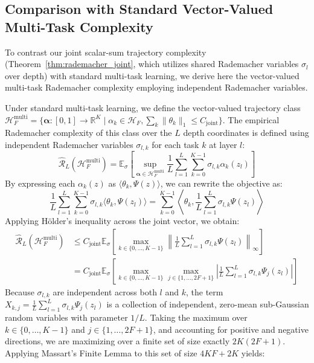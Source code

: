 \subsection{Comparison with Standard Vector-Valued Multi-Task Complexity}
\label{proof:thm_rademacher_joint_independent}
To contrast our joint scalar-sum trajectory complexity (Theorem~\ref{thm:rademacher_joint}, which utilizes shared Rademacher variables $\sigma_l$ over depth) with standard multi-task learning, we derive here the vector-valued multi-task Rademacher complexity employing independent Rademacher variables.

Under standard multi-task learning, we define the vector-valued trajectory class $\boldsymbol{\mathcal{H}}_F^{\text{multi}} = \{\boldsymbol{\alpha}: [0, 1] \to \mathbb{R}^K \mid \alpha_k \in \mathcal{H}_F, \sum_k \|\theta_k\|_1 \le C_{\text{joint}}\}$. The empirical Rademacher complexity of this class over the $L$ depth coordinates is defined using independent Rademacher variables $\sigma_{l,k}$ for each task $k$ at layer $l$:
\begin{equation}
    \widehat{\mathcal{R}}_L(\boldsymbol{\mathcal{H}}_F^{\text{multi}}) = \mathbb{E}_{\sigma} \left[ \sup_{\boldsymbol{\alpha} \in \boldsymbol{\mathcal{H}}_F^{\text{multi}}} \frac{1}{L} \sum_{l=1}^L \sum_{k=0}^{K-1} \sigma_{l,k} \alpha_k(z_l) \right]
\end{equation}
By expressing each $\alpha_k(z)$ as $\langle \theta_k, \Psi(z) \rangle$, we can rewrite the objective as:
\begin{equation}
    \frac{1}{L} \sum_{l=1}^L \sum_{k=0}^{K-1} \sigma_{l,k} \langle \theta_k, \Psi(z_l) \rangle = \sum_{k=0}^{K-1} \left\langle \theta_k, \frac{1}{L} \sum_{l=1}^L \sigma_{l,k} \Psi(z_l) \right\rangle
\end{equation}
Applying H{\"o}lder's inequality across the joint vector, we obtain:
\begin{align}
    \widehat{\mathcal{R}}_L(\boldsymbol{\mathcal{H}}_F^{\text{multi}}) &\le C_{\text{joint}} \mathbb{E}_{\sigma} \left[ \max_{k \in \{0, \dots, K-1\}} \left\| \frac{1}{L} \sum_{l=1}^L \sigma_{l,k} \Psi(z_l) \right\|_\infty \right] \\
    &= C_{\text{joint}} \mathbb{E}_{\sigma} \left[ \max_{k \in \{0, \dots, K-1\}} \max_{j \in \{1, \dots, 2F+1\}} \left| \frac{1}{L} \sum_{l=1}^L \sigma_{l,k} \Psi_j(z_l) \right| \right]
\end{align}
Because $\sigma_{l,k}$ are independent across both $l$ and $k$, the term $X_{k,j} = \frac{1}{L} \sum_{l=1}^L \sigma_{l,k} \Psi_j(z_l)$ is a collection of independent, zero-mean sub-Gaussian random variables with parameter $1/L$. Taking the maximum over $k \in \{0, \dots, K-1\}$ and $j \in \{1, \dots, 2F+1\}$, and accounting for positive and negative directions, we are maximizing over a finite set of size exactly $2K(2F+1)$. Applying Massart's Finite Lemma to this set of size $4KF+2K$ yields:
